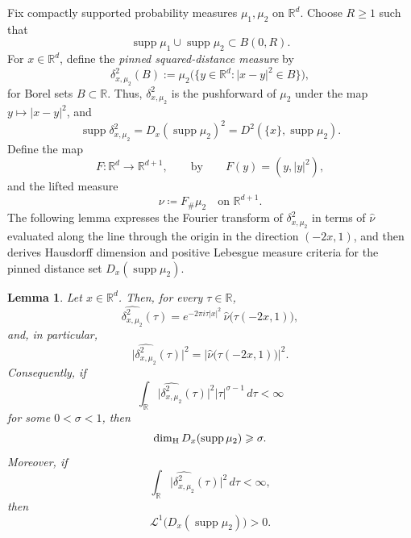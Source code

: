 \documentclass[11pt]{amsart}
\numberwithin{equation}{section}
\renewcommand{\ge}{\geqslant}
\newcommand{\hd}{\dim_{\textup{H}}}
\newtheorem{lemma}[theorem]{Lemma}
\newcommand{\spt}{\operatorname{supp}}
\theoremstyle{plain}
\theoremstyle{remark}
\newcommand{\R}{\mathbb{R}}
\newcommand{\Rd}{\mathbb{R}^d}
\newcommand{\Rdpo}{\mathbb{R}^{d+1}}
\newcommand{\supp}{\operatorname{supp}}
\newcommand{\cL}{\mathcal{L}}
\begin{document}
Fix compactly supported probability measures $\mu_1,\mu_2$ on $\Rd$.  Choose $R\ge 1$ such that
\[
\supp\mu_1\cup\supp\mu_2\subset B(0,R).
\]
For $x\in\Rd$, define the \emph{pinned squared-distance measure} by
\[
\delta_{x,\mu_2}^2(B):=\mu_2\bigl(\{y\in\Rd:|x-y|^2\in B\}\bigr),
\]
for Borel sets $B\subset\R$. Thus, $\delta_{x,\mu_2}^2$ is the pushforward of $\mu_2$ under the map
$y\mapsto |x-y|^2$, and
\[
\supp\delta_{x,\mu_2}^2=D_x(\supp\mu_2)^2 = D^2(\{x\}, \spt \mu_2).
\]
Define the map
\begin{equation}
\label{eq:lift-map}
F:\Rd\to\Rdpo,\qquad \text{by} \qquad  F(y)=(y,|y|^2),
\end{equation}
and the lifted measure
\begin{equation}
\label{eq:nu-def}
\nu\coloneqq F_{\#}\mu_2\quad\text{on }\Rdpo.
\end{equation}
The following lemma expresses the Fourier transform of $\delta_{x,\mu_2}^2$
in terms of $\widehat{\nu}$ evaluated along the line through the origin in
the direction $(-2x,1)$, and then derives Hausdorff dimension and
positive Lebesgue measure criteria for the pinned distance set
$D_x(\supp\mu_2)$.
\begin{lemma}\label{lem:pinned-distance-measure-fourier}
Let $x\in\Rd$. Then, for every $\tau\in\R$,
\begin{equation}\label{eq:pinned-fourier}
\widehat{\delta_{x,\mu_2}^2}(\tau)
=
e^{-2\pi i\tau|x|^2}\,\widehat\nu\bigl(\tau(-2x,1)\bigr),
\end{equation}
and, in particular,
\begin{equation}\label{eq:pinned-fourier-abs}
\bigl|\widehat{\delta_{x,\mu_2}^2}(\tau)\bigr|^2
=
\bigl|\widehat\nu\bigl(\tau(-2x,1)\bigr)\bigr|^2.
\end{equation}
Consequently, if
\[
\int_{\R}\bigl|\widehat{\delta_{x,\mu_2}^2}(\tau)\bigr|^2|\tau|^{\sigma-1}\,d\tau<\infty
\]
for some $0<\sigma<1$, then
\[
\hd D_x(\supp\mu_2)\ge \sigma.
\]
Moreover, if
\[
\int_{\R}\bigl|\widehat{\delta_{x,\mu_2}^2}(\tau)\bigr|^2\,d\tau<\infty,
\]
then
\[
\cL^1\bigl(D_x(\supp\mu_2)\bigr)>0.
\]
\end{lemma}
\end{document}

